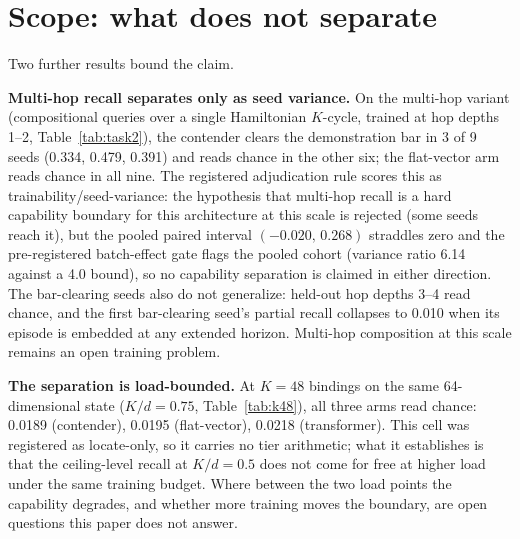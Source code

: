 \section{Scope: what does not separate}
\label{sec:scope}

Two further results bound the claim.

\begin{table}[t]
\centering
\small
\tabletasktwo
\caption{Multi-hop variant, nine seeds per compared arm, accuracy at the
matched final checkpoint (chance 0.031, demonstration bar 0.094; readings
above the bar in bold). Three of nine matrix fast-weight seeds learn the
task; zero of nine flat-vector seeds do. The pooled paired interval
straddles zero and is additionally flagged non-decision-grade by a
pre-registered batch-effect gate, so this table is a trainability
disclosure, not a capability claim.}
\label{tab:task2}
\end{table}

\textbf{Multi-hop recall separates only as seed variance.} On the
multi-hop variant (compositional queries over a single Hamiltonian
$K$-cycle, trained at hop depths 1--2, Table~\ref{tab:task2}), the contender clears the
demonstration bar in 3 of 9 seeds (0.334, 0.479, 0.391) and reads chance
in the other six; the flat-vector arm reads chance in all
nine. %
The registered adjudication rule scores this as
trainability/seed-variance: the hypothesis that multi-hop recall is a hard
capability boundary for this architecture at this scale is rejected (some
seeds reach it), but the pooled paired interval $(-0.020,\, 0.268)$
straddles zero and the pre-registered batch-effect gate flags the pooled
cohort (variance ratio 6.14 against a 4.0 bound), so no capability
separation is claimed in either direction. %
The bar-clearing seeds also do not generalize: held-out hop depths 3--4
read chance, and the first bar-clearing seed's partial recall collapses to
0.010 when its episode is embedded at any extended
horizon. %
Multi-hop composition at this scale remains an open training problem.

\begin{table}[t]
\centering
\small
\tablekstress
\caption{Stress cell at $K{=}48$ bindings on the same $d{=}64$ state
($K/d = 0.75$; chance 0.021). Every arm, including the matrix fast-weight
model, reads chance: the recall separation of Table~\ref{tab:main} is
load-bounded and does not extend to this operating point at this scale
and budget.}
\label{tab:k48}
\end{table}

\textbf{The separation is load-bounded.} At $K = 48$ bindings on the same
64-dimensional state ($K/d = 0.75$, Table~\ref{tab:k48}), all three arms read chance: 0.0189
(contender), 0.0195 (flat-vector), 0.0218
(transformer). %
This cell was registered as locate-only, so it carries no tier
arithmetic; what it establishes is that the ceiling-level recall at
$K/d = 0.5$ does not come for free at higher load under the same training
budget. Where between the two load points the capability degrades, and
whether more training moves the boundary, are open questions this paper
does not answer.
